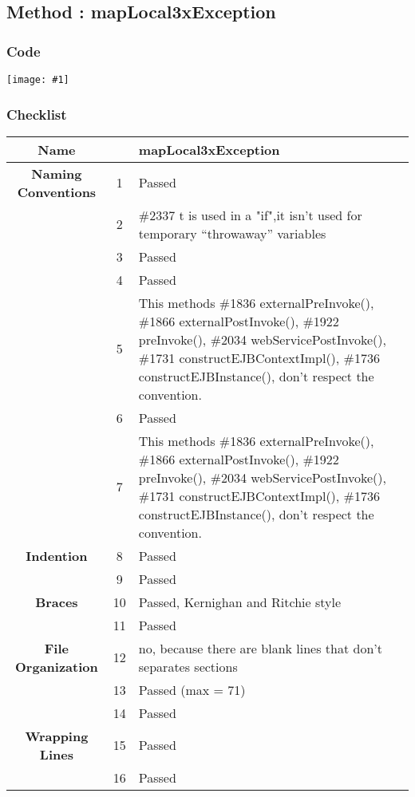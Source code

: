 \documentclass[11pt, a4paper,titlepage]{article}
\newcommand{\image}[1]{
	\begin{center}
		\noindent \texttt{[image: \#1]}
	\end{center}
	}
\begin{document}
\newpage
\subsection{Method : mapLocal3xException }
\subsubsection{Code}
\image{code_1.png}
\newpage
\subsubsection{Checklist}
\begin{tabularx}{\textwidth}{| c |c |X |}
	\hline \textbf{Name} & & mapLocal3xException \\
	\hline \textbf{Naming Conventions} & 1  & Passed  \\
	\hline  & 2 & \#2337 t is used in a "if",it isn't used for temporary “throwaway” variables\\
	\hline  & 3 & Passed \\
	\hline  & 4 & Passed \\
	\hline  & 5 & This methods \#1836 externalPreInvoke(), \#1866 externalPostInvoke(), \#1922 preInvoke(), \#2034 webServicePostInvoke(), \#1731 \textunderscore constructEJBContextImpl(), \#1736 \textunderscore constructEJBInstance(), don't respect the convention. \\
	\hline  & 6 & Passed \\
	\hline  & 7 & This methods \#1836 externalPreInvoke(), \#1866 externalPostInvoke(), \#1922 preInvoke(), \#2034 webServicePostInvoke(), \#1731 \textunderscore constructEJBContextImpl(), \#1736 \textunderscore constructEJBInstance(), don't respect the convention. \\
	\hline \textbf{Indention} & 8 & Passed \\
	\hline  & 9 & Passed \\
	\hline \textbf{Braces} & 10 & Passed, Kernighan and Ritchie style \\
	\hline  & 11 & Passed \\
	\hline \textbf{File Organization} & 12 & no, because there are blank lines that don't separates sections \\
	\hline  & 13 & Passed (max = 71) \\
	\hline  & 14 & Passed \\
	\hline \textbf{Wrapping Lines} & 15 & Passed \\
	\hline  & 16 & Passed \\
	
	\hline
\end{tabularx}
\end{document}
